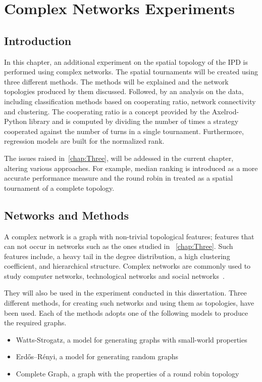 \chapter{Complex Networks Experiments}
\label{chap:Four}

\section{Introduction}
In this chapter, an additional experiment on the spatial topology of the IPD
is performed using complex networks. The spatial tournaments will be created using
three different methods. The methods will be explained and the network topologies produced by them
discussed. Followed, by an analysis on the data, including classification methods
based on cooperating ratio, network connectivity and clustering. The cooperating
ratio is a concept provided by the Axelrod-Python library and is computed
by dividing the number of times a strategy cooperated against the number of turns
in a single tournament. Furthermore, regression models are built for the normalized rank.

The issues raised in~\autoref{chap:Three}, will be addessed in the current chapter,
altering various approaches. For example, median ranking is introduced as a more
accurate performance measure and the round robin in treated as a spatial tournament
of a complete topology.

\section{Networks and Methods}
\label{sub:methods}
A complex network is a graph with non-trivial topological features;
features that can not occur in networks such as the ones studied in ~\autoref{chap:Three}.
Such features include, a heavy tail in the degree distribution, a high
clustering coefficient, and hierarchical structure. Complex networks are commonly
used to study computer networks, technological networks and social networks~\cite{VanDerHofstad2009}.

They will also be used in the experiment conducted in this dissertation. Three
different methods, for creating such networks and using them as topologies, have
been used. Each of the methods adopts one of the following models to produce the
required graphs.

\begin{itemize}
	\item Watts-Strogatz, a model for generating graphs with small-world properties\cite{Watts1998}
	\item Erdős–Rényi, a model for generating random graphs~\cite{Erdos1959}
	\item Complete Graph, a graph with the properties of a round robin topology\cite{Harris2010}
\end{itemize}

